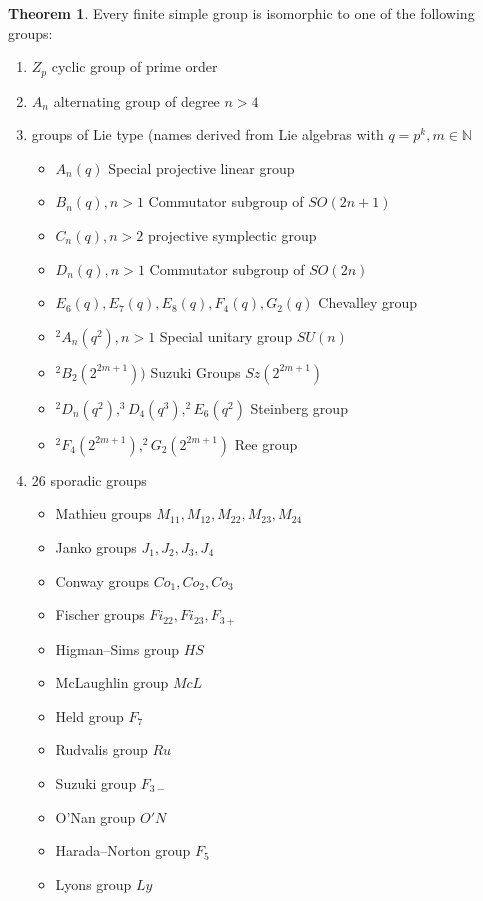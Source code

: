 \documentclass[10pt,a4paper]{book}
\theoremstyle{definition}
\newtheorem{theorem}{Theorem}[section]
\begin{document}
\begin{theorem}
Every finite simple group is isomorphic to one of the following groups:
\begin{enumerate}
    \item $Z_p$ cyclic group of prime order
    \item $A_n$ alternating group of degree $n>4$
    \item groups of Lie type (names derived from Lie algebras with $q=p^k, m\in\mathbb{N}$
    \begin{itemize}
        \item $A_n(q)$ Special projective linear group
        \item $B_n(q), n>1$ Commutator subgroup of $SO(2n+1)$ 
        \item $C_n(q), n>2$ projective symplectic group
        \item $D_n(q), n>1$ Commutator subgroup of $SO(2n)$ 
        \item $E_6(q), E_7(q), E_8(q), F_4(q), G_2(q)$ Chevalley group
        \item $^2A_n(q^2), n>1$ Special unitary group $SU(n)$
        \item $^2B_2(2^{2m+1}))$ Suzuki Groups $Sz(2^{2m+1})$
        \item $^2D_n(q^2), ^3D_4(q^3), ^2E_6(q^2)$ Steinberg group
        \item $^2F_4(2^{2m+1}), ^2G_2(2^{2m+1})$ Ree group
    \end{itemize}
    \item 26 sporadic groups
    \begin{itemize}
        \item Mathieu groups $M_{11}, M_{12}, M_{22}, M_{23}, M_{24}$
        \item Janko groups $J_1, J_2, J_3, J_4$
        \item Conway groups $Co_1, Co_2, Co_3$
        \item Fischer groups $Fi_{22}, Fi_{23}, F_{3+}$
        \item Higman–Sims group $HS$
        \item McLaughlin group $McL$
        \item Held group $F_7$
        \item Rudvalis group $Ru$
        \item Suzuki group $F_{3-}$
        \item O'Nan group $O'N$
        \item Harada–Norton group $F_5$
        \item Lyons group $Ly$

\end{itemize}
\end{enumerate}
\end{theorem}
\end{document}
